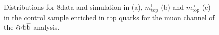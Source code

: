 \begin{figure}[!htb]
\centering
{}\\
\caption{Distributions for 8\TeV data and simulation in \mWH (a), $m_\mathrm{top}^\mathrm{l}$ (b) and $m_\mathrm{top}^\mathrm{h}$ (c) in the control sample enriched in top quarks for the muon channel of the $\ell\nu{\mathrm{b}\overline{\mathrm{b}}}$ analysis.}
\label{fig:tt-mtop8TeV}
\end{figure}